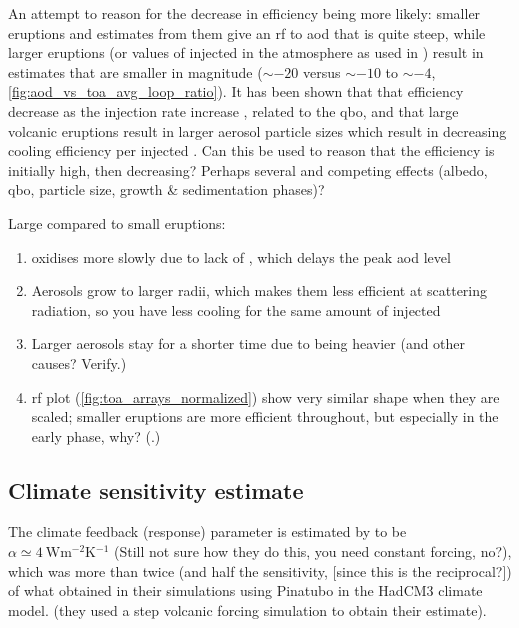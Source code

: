 \documentclass{ametsocV5}
\newcommand{\iso}[1][i]{{#1}njected \ce{SO2}}
\begin{document}
An attempt to reason for the decrease in efficiency being more likely: smaller eruptions
and estimates from them give an \acrshort{rf} to \acrshort{aod} that is quite steep,
while larger eruptions (or values of \iso{} in the atmosphere as used in
\citet{niemeier2015}) result in estimates that are smaller in magnitude (\(\sim-20\)
versus \(\sim-10\) to \(\sim-4\), \cref{fig:aod_vs_toa_avg_loop_ratio}). It has been
shown that that efficiency decrease as the injection rate increase \citep{niemeier2017},
related to the \acrshort{qbo}, and that large volcanic eruptions result in larger
aerosol particle sizes which result in decreasing cooling efficiency per \iso{}
\citep{english2013, timmreck2018}. Can this be used to reason that the efficiency is
initially high, then decreasing? Perhaps several and competing effects (albedo,
\acrshort{qbo}, particle size, growth \& sedimentation phases)?

Large compared to small eruptions:

\begin{enumerate}
  \item {} oxidises more slowly due to lack of , which delays the peak
        \acrshort{aod} level
  \item Aerosols grow to larger radii, which makes them less efficient at scattering radiation,
        so you have less cooling for the same amount of \iso{}
  \item Larger aerosols stay for a shorter time due to being heavier (and other causes? Verify.)
  \item \acrshort{rf} plot (\cref{fig:toa_arrays_normalized}) show very similar shape
        when they are scaled; smaller eruptions are more efficient throughout, but
        especially in the early phase, why? (.)
\end{enumerate}

\subsection{Climate sensitivity estimate}%
\label{sec:climate-sensitivity-estimate}

The climate feedback (response) parameter is estimated by \citet{jones2005} to be
\(\alpha \simeq \SI{4}{\watt\metre^{-2}\kelvin^{-1}}\) (Still not sure how they do this,
you need constant forcing, no?), which was more than twice (and half the sensitivity,
[since this is the reciprocal?]) of what \citet{gregory2016} obtained in their
simulations using Pinatubo in the HadCM3 climate model. (they used a step volcanic
forcing simulation to obtain their estimate).
\end{document}
